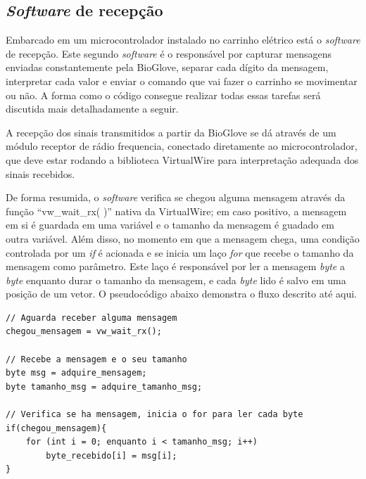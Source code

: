 \documentclass[
	12pt,				%
	openright,			%
	oneside,			%
	a4paper,			%
	english,			%
	brazil				%
	]{abntex2}
\begin{document}

	

		
		\subsection{\textit{Software} de recepção}


		Embarcado em um microcontrolador instalado no carrinho elétrico está o \textit{software} de recepção. Este segundo \textit{software} é o responsável por capturar mensagens enviadas constantemente pela BioGlove, separar cada dígito da mensagem, interpretar cada valor e enviar o comando que vai fazer o carrinho se movimentar ou não. A forma como o código consegue realizar todas essas tarefas será discutida mais detalhadamente a seguir.
		
		A recepção dos sinais transmitidos a partir da BioGlove se dá através de um módulo receptor de rádio frequencia, conectado diretamente ao microcontrolador, que deve estar rodando a biblioteca VirtualWire para interpretação adequada dos sinais recebidos.

		De forma resumida, o \textit{software} verifica se chegou alguma mensagem através da função ``vw\_wait\_rx( )'' nativa da VirtualWire; em caso positivo, a mensagem em si é guardada em uma variável e o tamanho da mensagem é guadado em outra variável. Além disso, no momento em que a mensagem chega, uma condição controlada por um \textit{if} é acionada e se inicia um laço \textit{for} que recebe o tamanho da mensagem como parâmetro. Este laço é responsável por ler a mensagem \textit{byte} a \textit{byte} enquanto durar o tamanho da mensagem, e cada \textit{byte} lido é salvo em uma posição de um vetor. O pseudocódigo abaixo demonstra o fluxo descrito até aqui.
\begin{lstlisting}
// Aguarda receber alguma mensagem
chegou_mensagem = vw_wait_rx();

// Recebe a mensagem e o seu tamanho
byte msg = adquire_mensagem;
byte tamanho_msg = adquire_tamanho_msg;
	
// Verifica se ha mensagem, inicia o for para ler cada byte
if(chegou_mensagem){
	for (int i = 0; enquanto i < tamanho_msg; i++)
		byte_recebido[i] = msg[i];		
}
\end{lstlisting}
\end{document}

